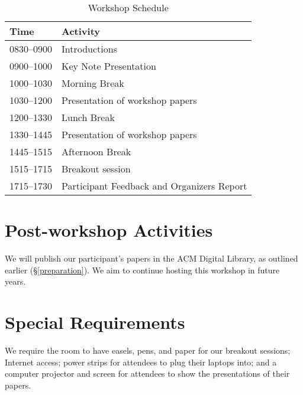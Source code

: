 \documentclass{sigplanconf}
\begin{document}
\begin{table} [!htbp] %
\begin{tabularx}{\columnwidth}{l|X}
\textbf{Time}   & \textbf{Activity} \\
\hline
0830--0900    & Introductions \vspace{1mm} \\
0900--1000    & Key Note Presentation \vspace{1mm} \\
1000--1030     & Morning Break~\vspace{1mm}\\
1030--1200   & Presentation of workshop papers \vspace{1mm}\\
1200--1330     & Lunch Break~\vspace{1mm}\\
1330--1445   & Presentation of workshop papers \vspace{1mm}\\
1445--1515    & Afternoon Break~\vspace{1mm}\\
1515--1715    & Breakout session \vspace{1mm}\\
1715--1730    & Participant Feedback and Organizers Report  \\
\end{tabularx}
\caption{Workshop Schedule}
\label{tab:schedule}
\end{table}

\section{Post-workshop Activities}

We will publish our participant's papers in the ACM Digital Library, as outlined earlier (\S \ref{preparation}). We aim to continue hosting this workshop in future years.

\section{Special Requirements}

We require the room to have easels, pens, and paper for our breakout sessions; 
Internet access; power strips for attendees to plug their laptops into; and a computer projector and
screen for attendees to show the presentations of their
papers.
\end{document}
